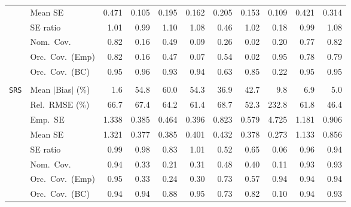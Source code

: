 \begin{landscape}
\begin{longtable}{llrrrrrrrrr}
 & Mean SE & 0.471 & 0.105 & 0.195 & 0.162 & 0.205 & 0.153 & 0.109 & 0.421 & 0.314 \\
 & SE ratio & \cellcolor{rankone}1.01 & \cellcolor{rankone}0.99 & 1.10 & \cellcolor{rankthree}1.08 & 0.46 & \cellcolor{ranktwo}1.02 & 0.18 & \cellcolor{rankone}0.99 & \cellcolor{rankthree}1.08 \\
 & Nom.\ Cov. & \cellcolor{rankone}0.82 & 0.16 & \cellcolor{rankthree}0.49 & 0.09 & 0.26 & 0.02 & 0.20 & \cellcolor{ranktwo}0.77 & \cellcolor{rankone}0.82 \\
 & Orc.\ Cov.\ (Emp) & \cellcolor{ranktwo}0.82 & 0.16 & 0.47 & 0.07 & 0.54 & 0.02 & \cellcolor{rankone}0.95 & 0.78 & \cellcolor{rankthree}0.79 \\
 & Orc.\ Cov.\ (BC) & \cellcolor{rankone}0.95 & \cellcolor{ranktwo}0.96 & \cellcolor{rankthree}0.93 & \cellcolor{ranktwo}0.94 & 0.63 & 0.85 & 0.22 & \cellcolor{rankone}0.95 & \cellcolor{rankone}0.95 \\
\addlinespace[2pt]
\multicolumn{11}{l}{\textbf{Binary \& Categorical Phase-One Covariates}} \\
\addlinespace[2pt]
\quad \texttt{SRS} & Mean $|$Bias$|$ (\%) & \cellcolor{rankone}1.6 & 54.8 & 60.0 & 54.3 & 36.9 & 42.7 & 9.8 & \cellcolor{rankthree}6.9 & \cellcolor{ranktwo}5.0 \\
 & Rel.\ RMSE (\%) & 66.7 & 67.4 & 64.2 & \cellcolor{rankthree}61.4 & 68.7 & \cellcolor{ranktwo}52.3 & 232.8 & 61.8 & \cellcolor{rankone}46.4 \\
 & Emp.\ SE & 1.338 & 0.385 & 0.464 & 0.396 & 0.823 & 0.579 & 4.725 & 1.181 & 0.906 \\
 & Mean SE & 1.321 & 0.377 & 0.385 & 0.401 & 0.432 & 0.378 & 0.273 & 1.133 & 0.856 \\
 & SE ratio & \cellcolor{rankone}0.99 & \cellcolor{ranktwo}0.98 & 0.83 & \cellcolor{rankone}1.01 & 0.52 & 0.65 & 0.06 & \cellcolor{rankthree}0.96 & 0.94 \\
 & Nom.\ Cov. & \cellcolor{rankone}0.94 & 0.33 & 0.21 & 0.31 & \cellcolor{rankthree}0.48 & 0.40 & 0.11 & \cellcolor{ranktwo}0.93 & \cellcolor{ranktwo}0.93 \\
 & Orc.\ Cov.\ (Emp) & \cellcolor{rankone}0.95 & 0.33 & 0.24 & 0.30 & \cellcolor{rankthree}0.73 & 0.57 & \cellcolor{ranktwo}0.94 & \cellcolor{ranktwo}0.94 & \cellcolor{ranktwo}0.94 \\
 & Orc.\ Cov.\ (BC) & \cellcolor{ranktwo}0.94 & \cellcolor{ranktwo}0.94 & 0.88 & \cellcolor{rankone}0.95 & 0.73 & 0.82 & 0.10 & \cellcolor{ranktwo}0.94 & \cellcolor{rankthree}0.93 \\

\end{longtable}
\end{landscape}
